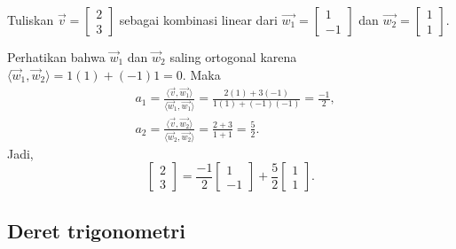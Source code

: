 \begin{example}
Tuliskan
$\vec{v} = \left[ \begin{smallmatrix} 2 \\ 3 \end{smallmatrix} \right]$
sebagai kombinasi linear dari
$\vec{w_1} = \left[ \begin{smallmatrix} 1 \\ -1 \end{smallmatrix} \right]$
dan
$\vec{w_2} = \left[ \begin{smallmatrix} 1 \\ 1 \end{smallmatrix} \right]$.

Perhatikan bahwa $\vec{w}_1$ dan $\vec{w}_2$ saling ortogonal
karena $\langle \vec{w}_1 , \vec{w}_2 \rangle = 1(1) + (-1)1 = 0$.
Maka
\begin{align*}
& a_1 = 
\frac{\langle \vec{v} , \vec{w_1} \rangle}{
\langle \vec{w}_1 , \vec{w_1} \rangle}
=
\frac{2(1) + 3(-1)}{1(1) + (-1)(-1)} = \frac{-1}{2} ,
\\
& a_2 = 
\frac{\langle \vec{v} , \vec{w_2} \rangle}{
\langle \vec{w}_2 , \vec{w_2} \rangle}
=
\frac{2 + 3}{1 + 1} = \frac{5}{2} .
\end{align*}
Jadi,
\begin{equation*}
\begin{bmatrix} 2 \\ 3 \end{bmatrix}
=
\frac{-1}{2}
\begin{bmatrix} 1 \\ -1 \end{bmatrix}
+
\frac{5}{2}
\begin{bmatrix} 1 \\ 1 \end{bmatrix} .
\end{equation*}
\end{example}

\subsection{Deret trigonometri}

